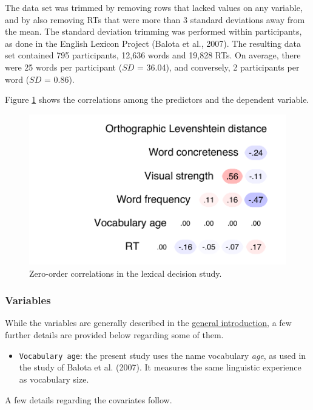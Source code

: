 \documentclass[
  12pt,
  man,floatsintext]{apa7}
\providecommand{\tightlist}{%
  \setlength{\itemsep}{0pt}\setlength{\parskip}{0pt}}
\begin{document}
The data set was trimmed by removing rows that lacked values on any variable, and by also removing RTs that were more than 3 standard deviations away from the mean. The standard deviation trimming was performed within participants, as done in the English Lexicon Project (Balota et al., 2007). The resulting data set contained 795 participants, 12,636 words and 19,828 RTs. On average, there were 25 words per participant (\(SD\) = 36.04), and conversely, 2 participants per word (\(SD\) = 0.86).

Figure \ref{fig:lexicaldecision-correlations} shows the correlations among the predictors and the dependent variable.

\begin{figure}

{\centering \includegraphics[width=0.52\linewidth]{thesis-core_files/figure-latex/lexicaldecision-correlations-1} 

}

\caption{Zero-order correlations in the lexical decision study.}\label{fig:lexicaldecision-correlations}
\end{figure}

\hypertarget{variables-2}{%
\subsubsection{Variables}\label{variables-2}}

While the variables are generally described in the \protect\hyperlink{present-studies}{\underline{general introduction}}, a few further details are provided below regarding some of them.

\begin{itemize}
\tightlist
\item
  \texttt{Vocabulary\ age}: the present study uses the name vocabulary \emph{age}, as used in the study of Balota et al. (2007). It measures the same linguistic experience as vocabulary size.
\end{itemize}

A few details regarding the covariates follow.
\end{document}
